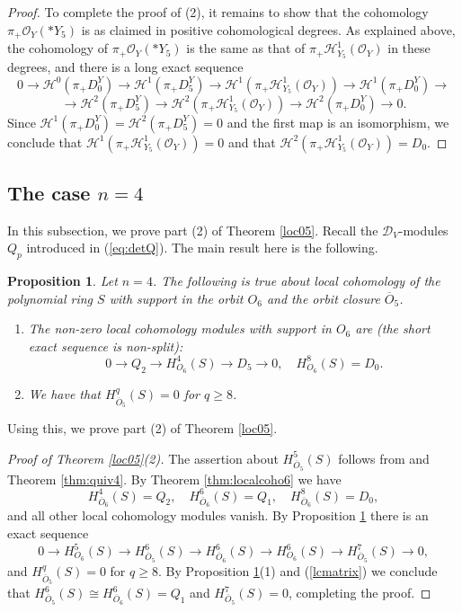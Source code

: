 \documentclass[11pt,reqno]{amsart}
\newcommand{\D}{\mathcal{D}}
\newcommand{\mc}[1]{\mathcal{#1}}
\newcommand{\ol}[1]{\overline{#1}}
\newtheorem{prop}[theorem]{Proposition}
\numberwithin{equation}{section}
\begin{document}
\begin{proof}
To complete the proof of (2), it remains to show that the cohomology $\pi_{+}\mathcal{O}_Y(\ast Y_5)$ is as claimed in positive cohomological degrees. As explained above, the cohomology of $\pi_{+}\mathcal{O}_Y(\ast Y_5)$ is the same as that of $\pi_{+}\mathscr{H}^1_{Y_5}(\mc{O}_Y)$ in these degrees, and there is a long exact sequence
$$
0\to \mc{H}^{0}(\pi_{+}D^Y_0)\to \mc{H}^{1}(\pi_{+}D^Y_5)\to \mc{H}^{1}(\pi_{+}\mathscr{H}^1_{Y_5}(\mc{O}_Y))\to \mc{H}^{1}(\pi_{+}D^Y_0)\to  
$$ 
$$
\to \mc{H}^{2}(\pi_{+}D^Y_5)\to \mc{H}^{2}(\pi_{+}\mathscr{H}^1_{Y_5}(\mc{O}_Y))\to \mc{H}^{2}(\pi_{+}D^Y_0)\to 0.
$$
Since $\mc{H}^{1}(\pi_{+}D^Y_0)=\mc{H}^{2}(\pi_{+}D^Y_5)=0$ and the first map is an isomorphism, we conclude that $\mc{H}^{1}(\pi_{+}\mathscr{H}^1_{Y_5}(\mc{O}_Y))=0$ and that $\mc{H}^{2}(\pi_{+}\mathscr{H}^1_{Y_5}(\mc{O}_Y))=D_0$.
\end{proof}



\subsection{The case $n=4$}\label{sec:o5n4} In this subsection, we prove part (2)  of Theorem \ref{loc05}. Recall the $\D_V$-modules $Q_p$ introduced in (\ref{eq:detQ}). The main result here is the following. 

\begin{prop}\label{locorbit06n4}
Let $n=4$. The following is true about local cohomology of the polynomial ring $S$ with support in the orbit $O_6$ and the orbit closure $\ol{O}_5$.
\begin{enumerate}
\item The non-zero local cohomology modules with support in $O_6$ are (the short exact sequence is non-split):
$$
0\to Q_2 \to H^4_{O_6}(S)\to D_5\to 0,\quad H^8_{O_6}(S)=D_0.
$$	
\item We have that $H^q_{\ol{O}_5}(S)=0$ for $q\geq 8$.
\end{enumerate}	
\end{prop}

Using this, we prove part (2) of Theorem \ref{loc05}.

\begin{proof}
[Proof of Theorem \ref{loc05}(2)]	 
The assertion about $H^5_{\ol{O}_5}(S)$ follows from \cite[Lemma 3.11]{lHorincz2019categories} and Theorem \ref{thm:quiv4}. By Theorem \ref{thm:localcoho6} we have
\begin{equation}\label{lcmatrix}
H^4_{\ol{O}_6}(S)=Q_2,\quad H^6_{\ol{O}_6}(S)=Q_1,\quad H^8_{\ol{O}_6}(S)=D_0,
\end{equation}
and all other local cohomology modules vanish. By Proposition \ref{locorbit06n4} there is an exact sequence
$$
0\to H^5_{O_6}(S)\to H^6_{\ol{O}_5}(S)\to H^6_{\ol{O}_6}(S)\to H^6_{O_6}(S)\to H^7_{\ol{O}_5}(S)\to 0,
$$
and $H^q_{\ol{O}_5}(S)=0$ for $q\geq 8$. By Proposition \ref{locorbit06n4}(1) and (\ref{lcmatrix}) we conclude that $H^6_{\ol{O}_5}(S)\cong H^6_{\ol{O}_6}(S)=Q_1$ and $H^7_{\ol{O}_5}(S)=0$, completing the proof.\end{proof}
\end{document}

